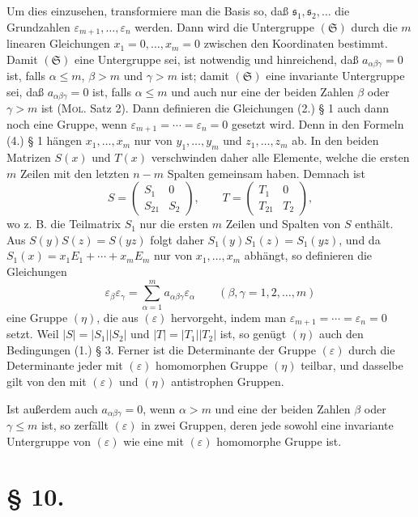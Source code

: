 \documentclass[11pt]{article}
\newcommand{\eps}{\varepsilon}
\begin{document}
Um dies einzusehen, transformiere man die Basis so, daß $\mathfrak s_1,\mathfrak s_2,\ldots$ die Grundzahlen $\eps_{m+1},\ldots,\eps_n$ werden. Dann wird die Untergruppe $(\mathfrak S)$ durch die $m$ linearen Gleichungen $x_1=0,\ldots,x_m=0$ zwischen den Koordinaten bestimmt. Damit $(\mathfrak S)$ eine Untergruppe sei, ist notwendig und hinreichend, daß $a_{\alpha\beta\gamma}=0$ ist, falls $\alpha\leq m$, $\beta>m$ und $\gamma>m$ ist; damit $(\mathfrak S)$ eine invariante Untergruppe sei, daß $a_{\alpha\beta\gamma}=0$ ist, falls $\alpha\leq m$ und auch nur eine der beiden Zahlen $\beta$ oder $\gamma>m$ ist (\textsc{Mol}. Satz 2). Dann definieren die Gleichungen (2.) § 1 auch dann noch eine Gruppe, wenn $\eps_{m+1}=\cdots=\eps_n=0$ gesetzt wird. Denn in den Formeln (4.) § 1 hängen $x_1,\ldots,x_m$ nur von $y_1,\ldots,y_m$ und $z_1,\ldots,z_m$ ab. In den beiden Matrizen $S(x)$ und $T(x)$ verschwinden daher alle Elemente, welche die ersten $m$ Zeilen mit den letzten $n-m$ Spalten gemeinsam haben. Demnach ist
\[
 S=\begin{pmatrix}S_1&0\\ S_{21}&S_2\end{pmatrix},
 \qquad
 T=\begin{pmatrix}T_1&0\\ T_{21}&T_2\end{pmatrix},
\]
wo z. B. die Teilmatrix $S_1$ nur die ersten $m$ Zeilen und Spalten von $S$ enthält. Aus $S(y)S(z)=S(yz)$ folgt daher $S_1(y)S_1(z)=S_1(yz)$, und da $S_1(x)=x_1E_1+\cdots+x_mE_m$ nur von $x_1,\ldots,x_m$ abhängt, so definieren die Gleichungen
\[
 \eps_\beta\eps_\gamma=\sum_{\alpha=1}^{m}a_{\alpha\beta\gamma}\eps_\alpha\qquad(\beta,\gamma=1,2,\ldots,m)
\]
eine Gruppe $(\eta)$, die aus $(\eps)$ hervorgeht, indem man $\eps_{m+1}=\cdots=\eps_n=0$ setzt. Weil $|S|=|S_1||S_2|$ und $|T|=|T_1||T_2|$ ist, so genügt $(\eta)$ auch den Bedingungen (1.) § 3. Ferner ist die Determinante der Gruppe $(\eps)$ durch die Determinante jeder mit $(\eps)$ homomorphen Gruppe $(\eta)$ teilbar, und dasselbe gilt von den mit $(\eps)$ und $(\eta)$ antistrophen Gruppen.

Ist außerdem auch $a_{\alpha\beta\gamma}=0$, wenn $\alpha>m$ und eine der beiden Zahlen $\beta$ oder $\gamma\leq m$ ist, so zerfällt $(\eps)$ in zwei Gruppen, deren jede sowohl eine invariante Untergruppe von $(\eps)$ wie eine mit $(\eps)$ homomorphe Gruppe ist.

\section*{§ 10.}
\end{document}
